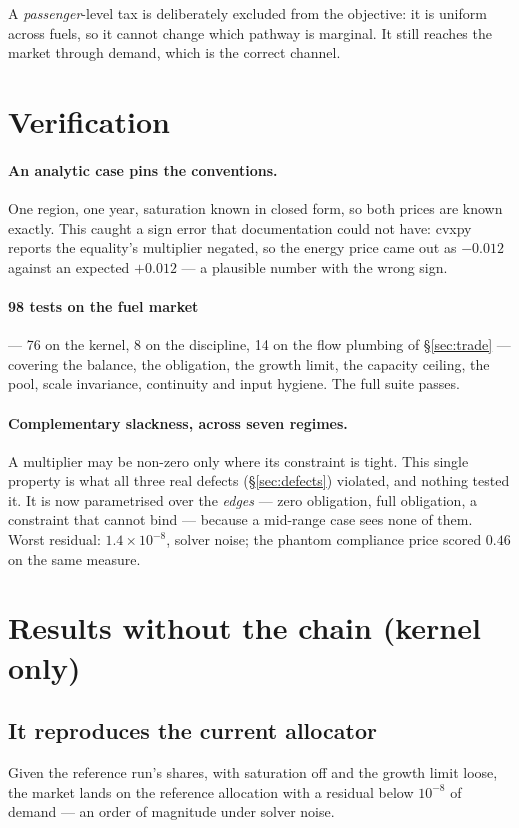 \documentclass[11pt,a4paper]{article}
\begin{document}
A \emph{passenger}-level tax is deliberately excluded from the objective: it is uniform
across fuels, so it cannot change which pathway is marginal. It still reaches the market
through demand, which is the correct channel.

\section{Verification}
\label{sec:verif}

\paragraph{An analytic case pins the conventions.} One region, one year, saturation known
in closed form, so both prices are known exactly. This caught a sign error that
documentation could not have: cvxpy reports the equality's multiplier negated, so the
energy price came out as $-0.012$ against an expected $+0.012$ --- a plausible number with
the wrong sign.

\paragraph{98 tests on the fuel market} --- 76 on the kernel, 8 on the discipline, 14 on
the flow plumbing of \S\ref{sec:trade} --- covering the balance, the obligation, the growth
limit, the capacity ceiling, the pool, scale invariance, continuity and input hygiene. The
full suite passes.

\paragraph{Complementary slackness, across seven regimes.} A multiplier may be non-zero
only where its constraint is tight. This single property is what all three real defects
(\S\ref{sec:defects}) violated, and nothing tested it. It is now parametrised over the
\emph{edges} --- zero obligation, full obligation, a constraint that cannot bind --- because
a mid-range case sees none of them. Worst residual: $1.4\times10^{-8}$, solver noise; the
phantom compliance price scored $0.46$ on the same measure.

\section{Results without the chain (kernel only)}
\label{sec:kernelresults}

\subsection{It reproduces the current allocator}
Given the reference run's shares, with saturation off and the growth limit loose, the
market lands on the reference allocation with a residual below $10^{-8}$ of demand --- an
order of magnitude under solver noise.
\end{document}
